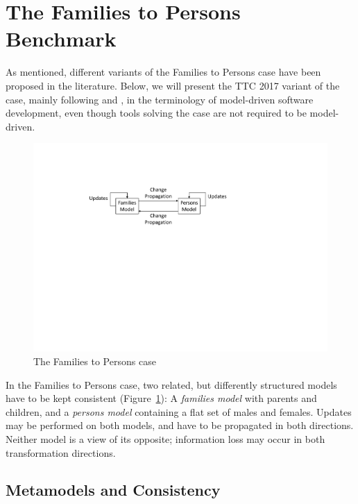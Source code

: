 

\section{The Families to Persons Benchmark}
\label{sec:FamiliesToPersons}



\noindent As mentioned, different variants of the Families to Persons case have been proposed in the literature. Below, we will present the TTC 2017 variant of the case, mainly following  \cite{Anjorin2017a} and \cite{ENASE2018-Westfechtel}, in the terminology of model-driven software development, even though tools solving the case are not required to be model-driven. 

\begin{figure}[tb!]
	\centering
	\includegraphics[width=0.8\columnwidth]{diagrams/Families2PersonsCase}
	\caption{The Families to Persons case}
	\label{fig:case}
\end{figure}

In the Families to Persons case, two related, but differently structured models have to be kept consistent (Figure~\ref{fig:case}): A \emph{families model} with parents and children, and a \emph{persons model} containing a flat set of males and females. Updates may be performed on both models, and have to be propagated in both directions. Neither model is a view of its opposite; information loss may occur in both transformation directions.

\subsection{Metamodels and Consistency}
\label{sec:MetamodelsAndConsistency}


